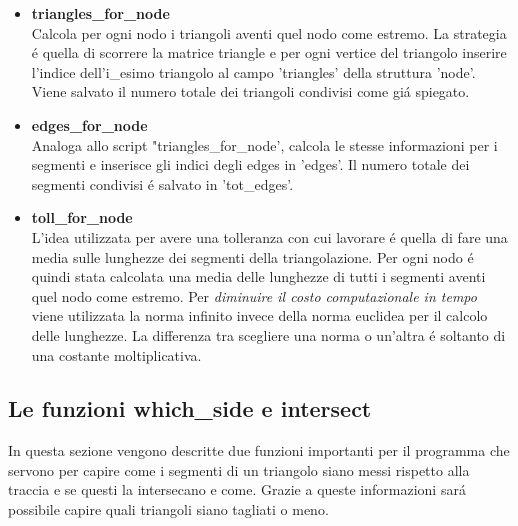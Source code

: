 \documentclass[11pt, a4paper]{article}
\begin{document}
\begin{itemize}
     \item \textbf{triangles\_for\_node}\\
    Calcola per ogni nodo i triangoli aventi quel nodo come estremo. La strategia \'e quella di scorrere la matrice triangle e per ogni vertice del triangolo inserire l'indice dell'i\_esimo triangolo al campo 'triangles' della struttura 'node'. Viene salvato il numero totale dei triangoli condivisi come gi\'a spiegato.
    \item \textbf{edges\_for\_node}\\
    Analoga allo script "triangles\_for\_node', calcola le stesse informazioni per i segmenti e inserisce gli indici degli edges in 'edges'. Il numero totale dei segmenti condivisi \'e salvato in 'tot\_edges'.
    \item \textbf{toll\_for\_node}\\
    L'idea utilizzata per avere una tolleranza con cui lavorare \'e quella di fare una media sulle lunghezze dei segmenti della triangolazione. Per ogni nodo \'e quindi stata calcolata una media delle lunghezze di tutti i segmenti aventi quel nodo come estremo. Per \textit{diminuire il costo computazionale in tempo} viene utilizzata la norma infinito invece della norma euclidea per il calcolo delle lunghezze. La differenza tra scegliere una norma o un'altra \'e soltanto di una costante moltiplicativa.

\end{itemize}

\subsection{\textbf{Le funzioni which\_side e intersect}}
In questa sezione vengono descritte due funzioni importanti per il programma che servono per capire come i segmenti di un triangolo siano messi rispetto alla traccia e se questi la intersecano e come. Grazie a queste informazioni sar\'a possibile capire quali triangoli siano tagliati o meno.
\end{document}
